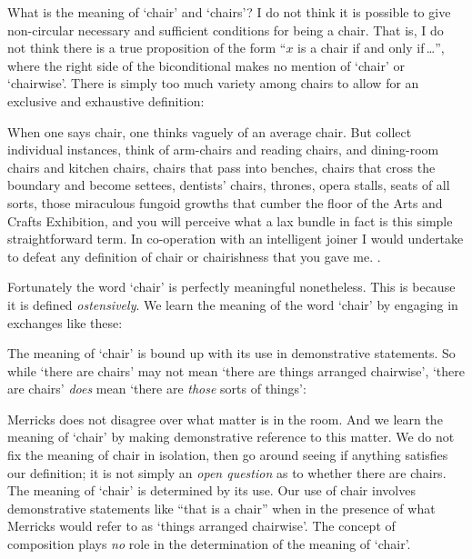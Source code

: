 \documentclass[11pt]{article}
\newenvironment{squote}{%
\begin{spacing}{1}
       	\begin{list}{}{%
\setlength{\labelwidth}{0pt}%
\rightmargin\leftmargin%
}
\item\relax
}{%
\end{list}%
\end{spacing}
}
\begin{document}
\begin{spacing}{1.25}
What is the meaning of `chair' and `chairs'?  I do not think it is
possible to give non-circular necessary and sufficient conditions for
being a chair.  That is, I do not think there is a true proposition of
the form ``$x$ is a chair if and only if\,\ldots '', where the right
side of the biconditional makes no mention of `chair' or `chairwise'.
There is simply too much variety among chairs to allow for an
exclusive and exhaustive definition:

\begin{squote}
When one says chair, one thinks vaguely of an average chair.  But
collect individual instances, think of arm-chairs and reading chairs,
and dining-room chairs and kitchen chairs, chairs that pass into
benches, chairs that cross the boundary and become settees, dentists'
chairs, thrones, opera stalls, seats of all sorts, those miraculous
fungoid growths that cumber the floor of the Arts and Crafts
Exhibition, and you will perceive what a lax bundle in fact is this
simple straightforward term.  In co-operation with an intelligent
joiner I would undertake to defeat any definition of chair or
chairishness that you gave me. \citep[384--385]{wells1904}.
\end{squote}

Fortunately the word `chair' is perfectly meaningful nonetheless.
This is because it is defined {\em ostensively}.  We learn the meaning
of the word `chair' by engaging in exchanges like these:



The meaning of `chair' is bound up with its use in demonstrative
statements.  So while `there are chairs' may not mean `there are
things arranged chairwise', `there are chairs' {\em does} mean `there
are {\em those} sorts of things':



Merricks does not disagree over what matter is in the room.  And we
learn the meaning of `chair' by making demonstrative reference to this
matter.  We do not fix the meaning of chair in isolation, then go
around seeing if anything satisfies our definition; it is not simply
an {\em open question} as to whether there are chairs.  The meaning of
`chair' is determined by its use.  Our use of chair involves
demonstrative statements like ``that is a chair'' when in the presence
of what Merricks would refer to as `things arranged chairwise'.  The
concept of composition plays {\em no} role in the determination of the
meaning of `chair'.


\end{spacing}
\end{document}
